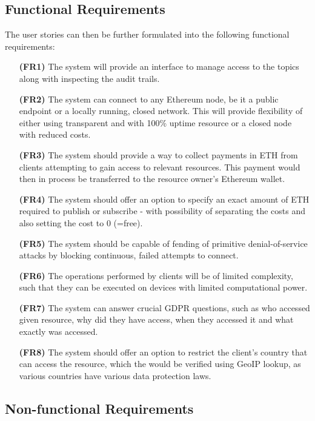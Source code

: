 \subsection{Functional Requirements}

The user stories can then be further formulated into the following functional requirements:

\begin{itemize}[leftmargin=4.5em]
\item[\textbf{(FR1)}] The system will provide an interface to manage access to the topics along with inspecting the audit trails.
\item[\textbf{(FR2)}] The system can connect to any Ethereum node, be it a public endpoint or a locally running, closed network. This will provide flexibility of either using transparent and with 100\% uptime resource or a closed node with reduced costs.
\item[\textbf{(FR3)}] The system should provide a way to collect payments in ETH from clients attempting to gain access to relevant resources. This payment would then in process be transferred to the resource owner's Ethereum wallet.
\item[\textbf{(FR4)}] The system should offer an option to specify an exact amount of ETH required to publish or subscribe - with possibility of separating the costs and also setting the cost to 0 (=free).
\item[\textbf{(FR5)}] The system should be capable of fending of primitive denial-of-service attacks by blocking continuous, failed attempts to connect.
\item[\textbf{(FR6)}] The operations performed by clients will be of limited complexity, such that they can be executed on devices with limited computational power.
\item[\textbf{(FR7)}] The system can answer crucial GDPR questions, such as who accessed given resource, why did they have access, when they accessed it and what exactly was accessed.
\item[\textbf{(FR8)}] The system should offer an option to restrict the client's country that can access the resource, which the would be verified using GeoIP lookup, as various countries have various data protection laws.
\end{itemize}

\subsection{Non-functional Requirements}

